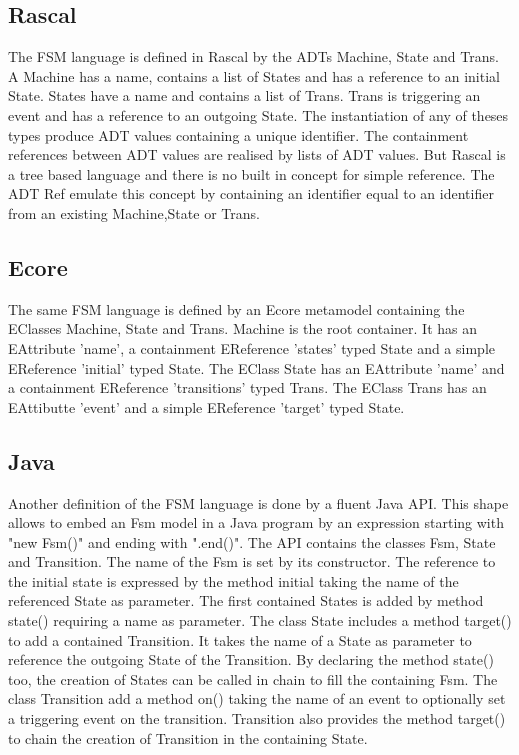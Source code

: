 \documentclass[sigplan]{acmart}
\begin{document}
\subsection{Rascal}

The FSM language is defined in Rascal by the ADTs Machine, State and Trans.
A Machine has a name, contains a list of States and has a reference to an initial State.
States have a name and contains a list of Trans.
Trans is triggering an event and has a reference to an outgoing State.
The instantiation of any of theses types produce ADT values containing a unique identifier.
The containment references between ADT values are realised by lists of ADT values. But Rascal is a tree based language and there is no built in concept for simple reference.
The ADT Ref emulate this concept by containing an identifier equal to an identifier from an existing Machine,State or Trans.

\subsection{Ecore}

The same FSM language is defined by an Ecore metamodel containing the EClasses Machine, State and Trans.
Machine is the root container. It has an EAttribute ’name’, a containment EReference ’states’ typed State and a simple EReference ’initial’ typed State.
The EClass State has an EAttribute ’name’ and a containment EReference ’transitions’ typed Trans.
The EClass Trans has an EAttibutte ’event’ and a simple EReference ’target’ typed State.

\subsection{Java}

Another definition of the FSM language is done by a fluent Java API.
This shape allows to embed an Fsm model in a Java program by an expression starting with "new Fsm()" and ending with ".end()".
The API contains the classes Fsm, State and Transition.
The name of the Fsm is set by its constructor.
The reference to the initial state is expressed by the method initial taking the name of the referenced State as parameter.
The first contained States is added by method state() requiring a name as parameter.
The class State includes a method target() to add a contained Transition. It takes the name of a State as parameter to reference the outgoing State of the Transition.
By declaring the method state() too, the creation of States can be called in chain to fill the containing Fsm.
The class Transition add a method on() taking the name of an event to optionally set a triggering event on the transition.
Transition also provides the method target() to chain the creation of Transition in the containing State.
\end{document}
